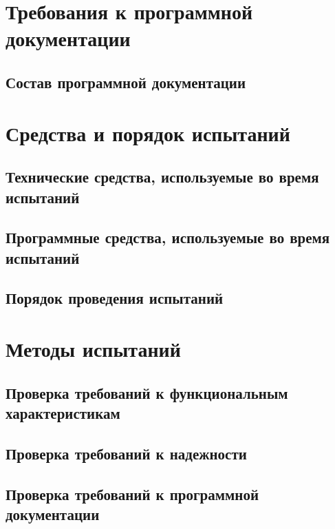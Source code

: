 \documentclass[a4paper,12pt]{article}
\begin{document}
    \section{Требования к программной документации}

    \subsection{Состав программной документации}

    \newpage


    \section{Средства и порядок испытаний}

    \subsection{Технические средства, используемые во время испытаний}

    \subsection{Программные средства, используемые во время испытаний}

    \subsection{Порядок проведения испытаний}

    \newpage


    \section{Методы испытаний}

    \subsection{Проверка требований к функциональным характеристикам}

    \subsection{Проверка требований к надежности}

    \subsection{Проверка требований к программной документации}

    \newpage
    \listRegistration
\end{document}

